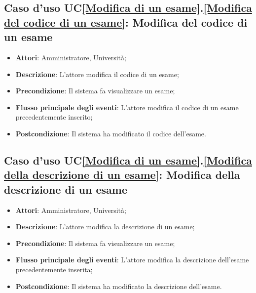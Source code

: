 \subsection{Caso d'uso UC\ref{Modifica di un esame}.\ref{Modifica del codice di un esame}: Modifica del codice di un esame}
\begin{itemize}
	\item \textbf{Attori}: Amministratore, Università;
	\item \textbf{Descrizione}: L'attore modifica il codice di un esame;
	
	\item \textbf{Precondizione}: Il sistema fa visualizzare un esame;
	
	
	\item \textbf{Flusso principale degli eventi}: L'attore modifica il codice di un esame precedentemente inserito;
	
	\item \textbf{Postcondizione}: Il sistema ha modificato il codice dell'esame.
	
\end{itemize}

\subsection{Caso d'uso UC\ref{Modifica di un esame}.\ref{Modifica della descrizione di un esame}: Modifica della descrizione di un esame}
\begin{itemize}
	\item \textbf{Attori}: Amministratore, Università;
	\item \textbf{Descrizione}: L'attore modifica la descrizione di un esame;
	
	\item \textbf{Precondizione}: Il sistema fa visualizzare un esame;
	
	\item \textbf{Flusso principale degli eventi}: L'attore modifica la descrizione dell'esame precedentemente inserita;
	
	\item \textbf{Postcondizione}: Il sistema ha modificato la descrizione dell'esame.
	
\end{itemize}


